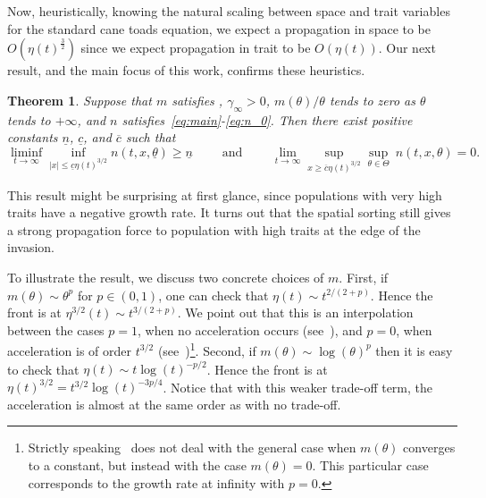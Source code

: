\documentclass[11pt]{article}    %
\newtheorem{theorem}{Theorem}
\begin{document}
Now, heuristically, knowing the natural scaling between space and trait variables for the standard cane toads equation, we expect a propagation in space to be $O(\eta(t)^\frac{3}{2})$ since we expect propagation in trait to be $O(\eta(t))$. Our next result, and the main focus of this work, confirms these heuristics.

\begin{theorem}\label{thm:acceleration}
	Suppose that $m$ satisfies , $\gamma_\infty > 0$,  $m(\theta)/\theta$ tends to zero as $\theta$ tends to $+\infty$, and $n$ satisfies~\eqref{eq:main}-\eqref{eq:n_0}.  Then there exist positive constants $\underline n$, $\underline c$, and $\overline c$ such that
	\[
		\liminf_{t \to \infty} \inf_{|x| \leq \underline c\eta(t)^{3/2}} n(t,x,\underline\theta) \geq \underline n
			\qquad\text{ and }\qquad
			\lim_{t\to \infty} \sup_{x\geq \overline{c} \eta(t)^{3/2}} \sup_{\theta \in \Theta} \ n(t,x,\theta) = 0.
	\]
\end{theorem}

This result might be surprising at first glance, since populations with very high traits have a negative growth rate. It turns out that the spatial sorting still gives a strong propagation force to population with high traits at the edge of the invasion. 
%
%



To illustrate the result, we discuss two concrete choices of $m$.  First, if $m(\theta) \sim \theta^p$ for $p\in(0,1)$, one can check that $\eta(t) \sim t^{2/(2+p)}$.  Hence the front is at $\eta^{3/2}(t) \sim t^{3/(2+p)}$.  We point out that this is an  interpolation between the cases $p=1$, when no acceleration occurs (see~), and $p=0$, when acceleration is of order $t^{3/2}$ (see~\cite{BerestyckiMouhotRaoul,BHR_Acceleration})\footnote{Strictly speaking~\cite{BerestyckiMouhotRaoul,BHR_Acceleration} does not deal with the general case when $m(\theta)$ converges to a constant, but instead with the case $m(\theta) = 0$.  This particular case corresponds to the growth rate at infinity with $p = 0$.}.  Second, if $m(\theta) \sim \log(\theta)^p$ then it is easy to check that $\eta(t) \sim t\log(t)^{-p/2}$.  Hence the front is at $\eta(t)^{3/2} = t^{3/2}\log(t)^{-3p/4}$.  Notice that with this weaker trade-off term, the acceleration is almost at the same order as with no trade-off.
\end{document}
